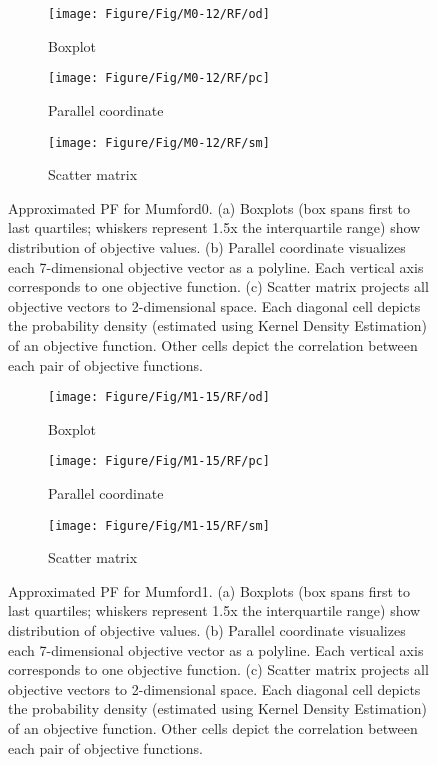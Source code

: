 \begin{figure}[!htbp]
	\centering
	\begin{subfigure}{0.6\textwidth}
		\texttt{[image: Figure/Fig/M0-12/RF/od]}
		\caption{Boxplot}
	\end{subfigure}
	\newline
	\begin{subfigure}{0.6\textwidth}
		\texttt{[image: Figure/Fig/M0-12/RF/pc]}
		\caption{Parallel coordinate}
	\end{subfigure}
	\newline
	\begin{subfigure}{0.85\textwidth}
		\texttt{[image: Figure/Fig/M0-12/RF/sm]}
		\caption{Scatter matrix}
	\end{subfigure}
	\caption{Approximated PF for Mumford0. (a) Boxplots (box spans first to last quartiles; whiskers represent 1.5x the interquartile range) show distribution of objective values. (b) Parallel coordinate visualizes each 7-dimensional objective vector as a polyline. Each vertical axis corresponds to one objective function. (c) Scatter matrix projects all objective vectors to 2-dimensional space. Each diagonal cell depicts the probability density (estimated using Kernel Density Estimation) of an objective function. Other cells depict the correlation between each pair of objective functions.}
	\label{fig:apf_m0}
\end{figure}
\begin{figure}[!htbp]
	\centering
	\begin{subfigure}{0.6\textwidth}
		\texttt{[image: Figure/Fig/M1-15/RF/od]}
		\caption{Boxplot}
	\end{subfigure}
	\newline
	\begin{subfigure}{0.6\textwidth}
		\texttt{[image: Figure/Fig/M1-15/RF/pc]}
		\caption{Parallel coordinate}
	\end{subfigure}
	\newline
	\begin{subfigure}{0.85\textwidth}
		\texttt{[image: Figure/Fig/M1-15/RF/sm]}
		\caption{Scatter matrix}
	\end{subfigure}
	\caption{Approximated PF for Mumford1. (a) Boxplots (box spans first to last quartiles; whiskers represent 1.5x the interquartile range) show distribution of objective values. (b) Parallel coordinate visualizes each 7-dimensional objective vector as a polyline. Each vertical axis corresponds to one objective function. (c) Scatter matrix projects all objective vectors to 2-dimensional space. Each diagonal cell depicts the probability density (estimated using Kernel Density Estimation) of an objective function. Other cells depict the correlation between each pair of objective functions.}
	\label{fig:apf_m1}
\end{figure}

